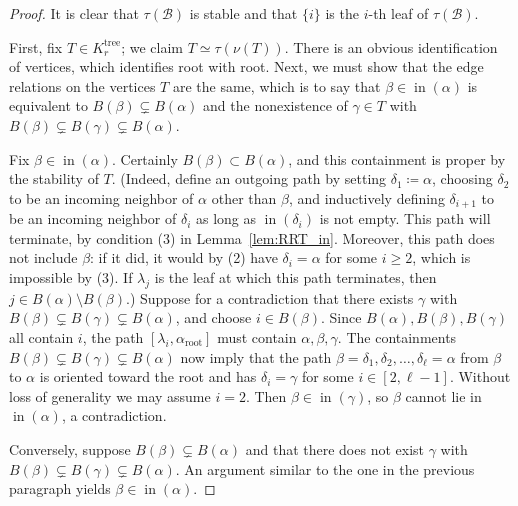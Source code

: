 \documentclass[11pt]{amsart}
\theoremstyle{definition}
\theoremstyle{remark}
\theoremstyle{plain}
\newcommand{\sB}{\mathscr{B}}
\newcommand{\on}{\operatorname}
\newcommand{\incom}{\on{in}}
\renewcommand{\root}{{\on{root}}}
\newcommand{\tree}{{\on{tree}}}
\begin{document}
\begin{proof}
It is clear that $\tau(\sB)$ is stable and that $\{i\}$ is the $i$-th leaf of $\tau(\sB)$.

\medskip


\medskip

\noindent First, fix $T \in K_r^\tree$; we claim $T \simeq \tau(\nu(T))$.
There is an obvious identification of vertices, which identifies root with root.
Next, we must show that the edge relations on the vertices $T$ are the same, which is to say that $\beta \in \incom(\alpha)$ is equivalent to $B(\beta) \subsetneq B(\alpha)$ and the nonexistence of $\gamma \in T$ with $B(\beta) \subsetneq B(\gamma) \subsetneq B(\alpha)$.

Fix $\beta \in \incom(\alpha)$.
Certainly $B(\beta) \subset B(\alpha)$, and this containment is proper by the stability of $T$.
(Indeed, define an outgoing path by setting $\delta_1 \coloneqq \alpha$, choosing $\delta_2$ to be an incoming neighbor of $\alpha$ other than $\beta$, and inductively defining $\delta_{i+1}$ to be an incoming neighbor of $\delta_i$ as long as $\incom(\delta_i)$ is not empty.
This path will terminate, by condition (3) in Lemma~\ref{lem:RRT_in}.
Moreover, this path does not include $\beta$: if it did, it would by (2) have $\delta_i = \alpha$ for some $i \geq 2$, which is impossible by (3).
If $\lambda_j$ is the leaf at which this path terminates, then $j \in B(\alpha)\setminus B(\beta)$.)
Suppose
for a contradiction
that there exists $\gamma$ with $B(\beta) \subsetneq B(\gamma) \subsetneq B(\alpha)$, and choose $i \in B(\beta)$.
Since $B(\alpha), B(\beta), B(\gamma)$ all contain $i$, the path $[\lambda_i,\alpha_\root]$ must contain $\alpha, \beta, \gamma$.
The containments $B(\beta)\subsetneq B(\gamma) \subsetneq B(\alpha)$ now imply that the path $\beta = \delta_1, \delta_2, \ldots, \delta_\ell = \alpha$ from $\beta$ to $\alpha$ is oriented toward the root and has $\delta_i = \gamma$ for some $i \in [2,\ell-1]$.
Without loss of generality we may assume $i = 2$.
Then $\beta \in \incom(\gamma)$, so $\beta$ cannot lie in $\incom(\alpha)$, a contradiction.

Conversely, suppose $B(\beta) \subsetneq B(\alpha)$ and that there does not exist $\gamma$ with $B(\beta) \subsetneq B(\gamma) \subsetneq B(\alpha)$.
An argument similar to the one in the previous paragraph yields $\beta \in \incom(\alpha)$.

\medskip


\end{proof}
\end{document}
